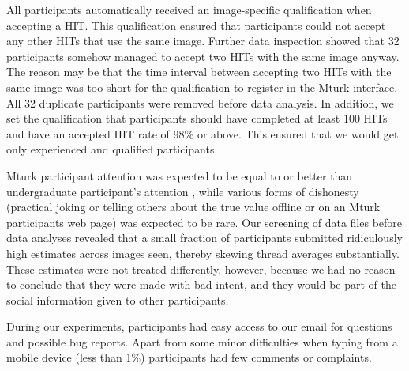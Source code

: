 \documentclass[9pt,twoside,lineno]{pnas-new}
\begin{document}
All participants automatically received an image-specific qualification when accepting a HIT. This qualification ensured that participants could not accept any other HITs that use the same image. Further data inspection showed that 32 participants somehow managed to accept two HITs with the same image anyway. The reason may be that the time interval between accepting two HITs with the same image was too short for the qualification to register in the Mturk interface. All 32 duplicate participants were removed before data analysis. In addition, we set the qualification that participants should have completed at least 100 HITs and have an accepted HIT rate of 98\% or above. This ensured that we would get only experienced and qualified participants.

Mturk participant attention was expected to be equal to or better than undergraduate participant’s attention \cite{hauser2016attentive}, while various forms of dishonesty (practical joking or telling others about the true value offline or on an Mturk participants web page) was expected to be rare. Our screening of data files before data analyses revealed that a small fraction of participants submitted ridiculously high estimates across images seen, thereby skewing thread averages substantially. These estimates were not treated differently, however, because we had no reason to conclude that they were made with bad intent, and they would be part of the social information given to other participants.

During our experiments, participants had easy access to our email for questions and possible bug reports. Apart from some minor difficulties when typing from a mobile device (less than 1\%) participants had few comments or complaints.

\end{document}
